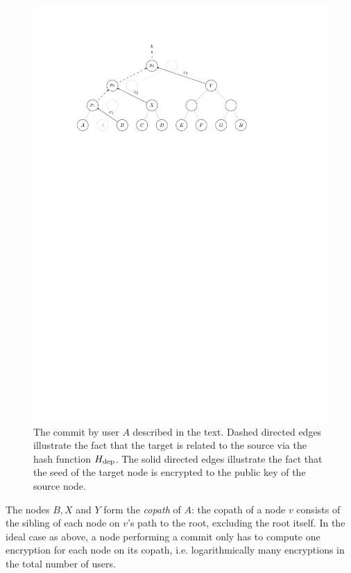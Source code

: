 \begin{figure}
	\begin{center}
		\includegraphics{figures/treekem-simple-update}
	\end{center}
	\caption{The commit by user $A$ described in the text. Dashed directed edges illustrate the fact that the target is related to the source via the hash function  $H_\mathrm{dep}$. The solid directed edges illustrate the fact that the seed of the target node is encrypted to the public key of the source node.}\label{fig:treekem-simple-update}
\end{figure}

The nodes $B, X$ and $Y$ form the \emph{copath} of $A$: the copath of a node $v$ consists of the sibling of each node on $v$'s path to the root, excluding the root itself. In the ideal case as above, a node performing a commit only has to compute one encryption for each node on its copath, i.e. logarithmically many encryptions in the total number of users.

